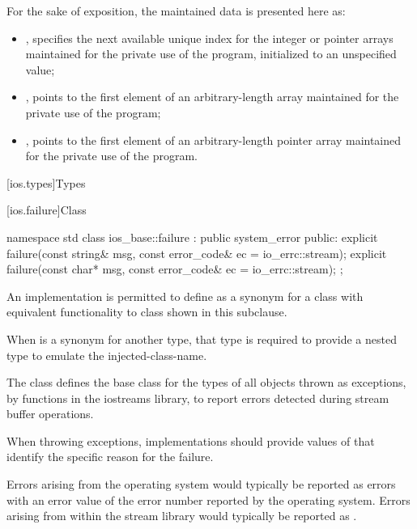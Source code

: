\pnum
\begin{note}
For the sake of exposition, the maintained data is presented here as:
\begin{itemize}
\item
{},
specifies the next available
unique index for the integer or pointer arrays maintained for the private use
of the program, initialized to an unspecified value;
\item
{},
points to the first element of an
arbitrary-length
array maintained for the private use of the
program;
\item
{},
points to the first element of an
arbitrary-length pointer array maintained for the private use of the program.
\end{itemize}
\end{note}

[ios.types]{Types}

[ios.failure]{Class }

%
%
\begin{codeblock}
namespace std {
  class ios_base::failure : public system_error {
  public:
    explicit failure(const string& msg, const error_code& ec = io_errc::stream);
    explicit failure(const char* msg, const error_code& ec = io_errc::stream);
  };
}
\end{codeblock}

\pnum
An implementation is permitted to define 
as a synonym for a class with equivalent functionality
to class  shown in this subclause.
\begin{note}
When  is a synonym for another type,
that type is required to provide a nested type 
to emulate the injected-class-name.
\end{note}
The class
defines the base class
for the types of all objects thrown as exceptions,
by functions in the iostreams library,
to report errors detected during stream buffer operations.

\pnum
When throwing  exceptions, implementations should provide
values of  that identify the specific reason for the failure.
\begin{note}
Errors arising from the operating system would typically be reported as
 errors with an error value of the error number
reported by the operating system. Errors arising from within the stream library would
typically be reported as .
\end{note}

